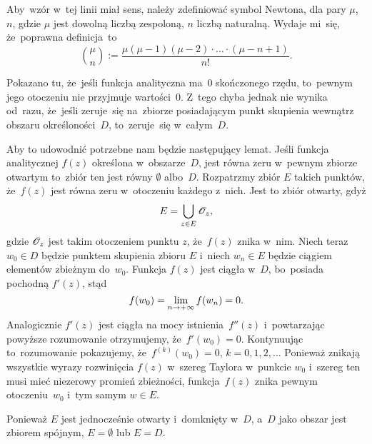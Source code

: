 \documentclass[a4paper,11pt]{article}
\begin{document}
\vspace{\spaceFour}


\start {} Aby~wzór w~tej linii miał sens, należy
zdefiniować symbol Newtona, dla pary $\mu$, $n$, gdzie $\mu$ jest
dowolną liczbą zespoloną, $n$ liczbą naturalną. Wydaje mi~się,
że~poprawna definicja~to
\begin{equation}
  \label{eq:Leja-43}
  \binom{ \mu }{ n } := \frac{ \mu ( \mu - 1 ) ( \mu - 2 ) \cdot \ldots
    \cdot ( \mu - n + 1 ) }{ n! }.
\end{equation}

\vspace{\spaceFour}


\start {} Pokazano tu, że~jeśli funkcja analityczna ma~0
skończonego rzędu, to~pewnym jego otoczeniu nie przyjmuje wartości~0.
Z~tego chyba jednak nie wynika od~razu, że~jeśli zeruje~się na~zbiorze
posiadającym punkt skupienia wewnątrz obszaru określoności~$D$,
to~zeruje~się w~całym~$D$.

Aby to udowodnić potrzebne nam będzie następujący lemat. Jeśli funkcja
analitycznej $f( z )$ określona w~obszarze~$D$, jest równa zeru
w~pewnym zbiorze otwartym to~zbiór ten jest równy $\emptyset$
albo~$D$. Rozpatrzmy zbiór $E$ takich punktów, że~$f( z )$ jest równa
zeru w~otoczeniu każdego z~nich. Jest to zbiór otwarty, gdyż
\begin{equation}
  \label{eq:Leja-44}
  E = \bigcup_{ z \in E } \mathcal{O}_{ z },
\end{equation}
gdzie $\mathcal{O}_{ z }$ jest takim otoczeniem punktu $z$, że~$f( z )$ znika
w~nim. Niech teraz $w_{ 0 } \in D$ będzie punktem skupienia zbioru $E$
i~niech $w_{ n } \in E$ będzie ciągiem elementów zbieżnym
do~$w_{ 0 }$. Funkcja $f( z )$ jest ciągła w~$D$, bo~posiada pochodną
$f'( z )$, stąd
\begin{equation}
  \label{eq:Leja-45}
  f( w_{ 0 } ) = \lim\limits_{ n \to +\infty } f( w_{ n } ) = 0.
\end{equation}
Analogicznie $f'( z )$ jest ciągła na mocy istnienia~$f''( z )$
i~powtarzając powyższe rozumowanie otrzymujemy,
że~$f'( w_{ 0 } ) = 0$. Kontynuując to~rozumowanie pokazujemy,
że~$f^{ ( k ) }( w_{ 0 } ) = 0$, $k = 0, 1, 2, \ldots$ Ponieważ
znikają wszystkie wyrazy rozwinięcia $f( z )$ w~szereg Taylora
w~punkcie $w_{ 0 }$ i~szereg ten musi mieć niezerowy promień
zbieżności, funkcja~$f( z )$ znika pewnym otoczeniu~$w_{ 0 }$ i~tym
samym $w \in E$.

Ponieważ $E$ jest jednocześnie otwarty i~domknięty w~$D$, a~$D$ jako
obszar jest zbiorem spójnym, $E = \emptyset$ lub $E = D$.
\end{document}
